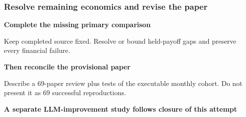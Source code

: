 \documentclass[aspectratio=169,10pt,xcolor=table]{beamer}
\begin{document}
\begin{frame}[t]
\frametitle{Resolve remaining economics and revise the paper}
\relax
{\large\color{Ink}\bfseries Complete the missing primary comparison}\par\medskip
{\small\color{Muted} Keep completed source fixed. Resolve or bound held-payoff gaps and preserve every financial failure.}\par\medskip
\vspace{.15cm}
{\large\color{Ink}\bfseries Then reconcile the provisional paper}\par\medskip
{\small\color{Muted} Describe a 69-paper review plus tests of the executable monthly cohort. Do not present it as 69 successful reproductions.}\par\medskip
{\scriptsize\color{Teal}\bfseries A separate LLM-improvement study follows closure of this attempt}\par\medskip
{}
\end{frame}
\end{document}

